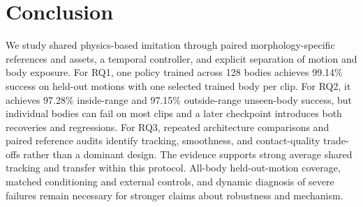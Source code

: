 \section{Conclusion}\label{sec:conclusion}
We study shared physics-based imitation through paired morphology-specific
references and assets, a temporal controller, and explicit separation of
motion and body exposure. For RQ1, one policy trained across 128 bodies
achieves 99.14\% success on held-out motions with one selected trained body
per clip. For RQ2, it achieves 97.28\% inside-range and 97.15\% outside-range
unseen-body success, but individual bodies can fail on most clips and a later
checkpoint introduces both recoveries and regressions. For RQ3, repeated
architecture comparisons and paired reference audits identify tracking,
smoothness, and contact-quality trade-offs rather than a dominant design.
The evidence supports strong average shared tracking and transfer within
this protocol. All-body held-out-motion coverage, matched conditioning and
external controls, and dynamic diagnosis of severe failures remain necessary
for stronger claims about robustness and mechanism.
